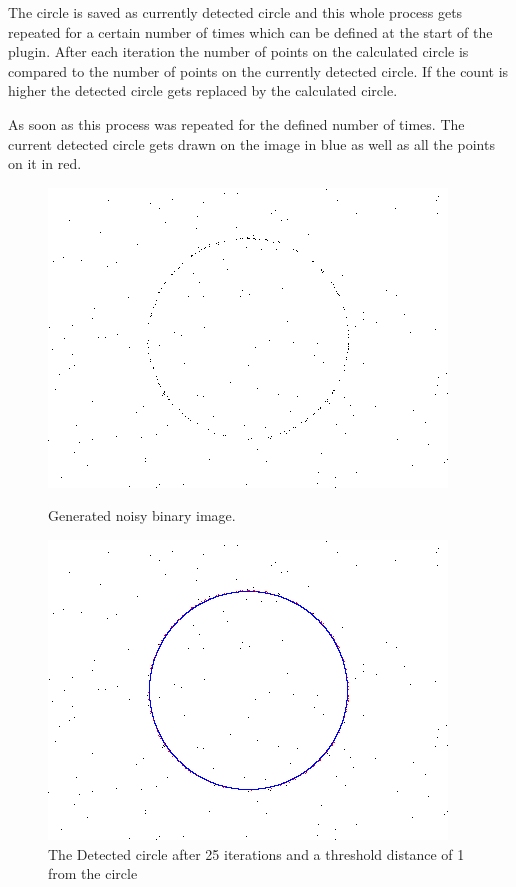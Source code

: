 The circle is saved as currently detected circle and this whole process gets repeated for a certain number of times which can be defined at the start of the plugin. After each iteration the number of points on the calculated circle is compared to the number of points on the currently detected circle. If the count is higher the detected circle gets replaced by the calculated circle.
 
As soon as this process was repeated for the defined number of times. The current detected circle gets drawn on the image in blue as well as all the points on it in red.

\begin{figure}
	\centering
	\begin{minipage}[t]{0.49\linewidth}
		\centering
			\includegraphics[width=.90\linewidth]{images/circle-test}
		\caption{Generated noisy binary image.}
	\end{minipage}
	\hfill
	\begin{minipage}[t]{0.49\linewidth}
		\centering
		\includegraphics[width=.90\linewidth]{images/circle_result}
		\caption{The Detected circle after 25 iterations and a threshold distance of 1 from the circle}
	\end{minipage}
\end{figure}

